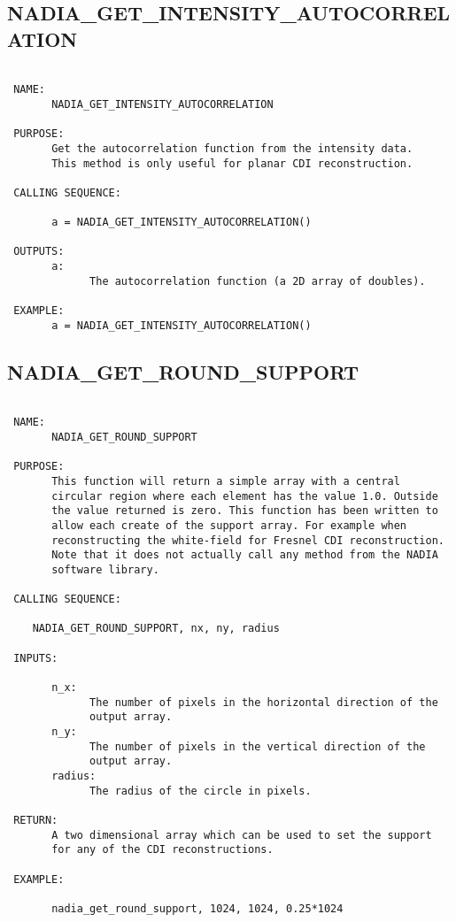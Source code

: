  
\subsection{NADIA\_GET\_INTENSITY\_AUTOCORRELATION}
\begin{verbatim}

 NAME:
       NADIA_GET_INTENSITY_AUTOCORRELATION

 PURPOSE:
       Get the autocorrelation function from the intensity data.
       This method is only useful for planar CDI reconstruction.

 CALLING SEQUENCE:

       a = NADIA_GET_INTENSITY_AUTOCORRELATION()

 OUTPUTS:
       a:
             The autocorrelation function (a 2D array of doubles).

 EXAMPLE:
       a = NADIA_GET_INTENSITY_AUTOCORRELATION()

\end{verbatim}

\subsection{NADIA\_GET\_ROUND\_SUPPORT}
\begin{verbatim}

 NAME:
       NADIA_GET_ROUND_SUPPORT

 PURPOSE: 
       This function will return a simple array with a central
       circular region where each element has the value 1.0. Outside
       the value returned is zero. This function has been written to
       allow each create of the support array. For example when
       reconstructing the white-field for Fresnel CDI reconstruction.
       Note that it does not actually call any method from the NADIA
       software library.

 CALLING SEQUENCE:

	NADIA_GET_ROUND_SUPPORT, nx, ny, radius

 INPUTS:

       n_x: 
             The number of pixels in the horizontal direction of the
             output array.
       n_y: 
             The number of pixels in the vertical direction of the
             output array.
       radius: 
             The radius of the circle in pixels.

 RETURN:
       A two dimensional array which can be used to set the support
       for any of the CDI reconstructions.

 EXAMPLE:

       nadia_get_round_support, 1024, 1024, 0.25*1024

\end{verbatim}


